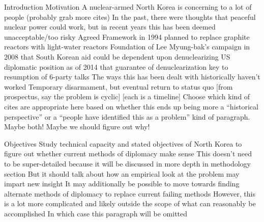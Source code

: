 \documentclass{article}
\begin{document}
\begin{outline}[enumerate]


\1 Introduction
    \2 Motivation
        \3 	A nuclear-armed North Korea is concerning to a lot of people
            \4 \cite{kerry} (probably grab more cites)
            \4 In the past, there were thoughts that peaceful nuclear power could work, but in recent years this has been deemed unacceptable/too risky
            \4 Agreed Framework in 1994 planned to replace graphite reactors with light-water reactors \cite{agreed}
            \4 Foundation of Lee Myung-bak’s campaign in 2008 that South Korean aid could be dependent upon denuclearizing \cite{snyder}
            \4 US diplomatic position as of 2014 that guarantee of denuclearization key to resumption of 6-party talks \cite{panda}
        \3 The ways this has been dealt with historically haven’t worked
            \4 Temporary disarmament, but eventual return to status quo
            \4 \cite{blair,cfr,fisher,gause} [from prospectus, say the problem is cyclic]
            \4 \cite{davenport,nti15,iaea09} [each is a timeline]
            \4 Choose which kind of cites are appropriate here based on whether this ends up being more a “historical perspective” or a “people have identified this as a problem” kind of paragraph. Maybe both!
        \3 Maybe we should figure out why!

    \2 Objectives
        \3 Study technical capacity and stated objectives of North Korea to figure out whether current methods of diplomacy make sense
            \4 This doesn’t need to be super-detailed because it will be discussed in more depth in methodology section
            \4 But it should talk about how an empirical look at the problem may impart new insight
        \3 It may additionally be possible to move towards finding alternate methods of diplomacy to replace current failing methods
            \4 However, this is a lot more complicated and likely outside the scope of what can reasonably be accomplished
            \4 In which case this paragraph will be omitted


\end{outline}
\end{document}
